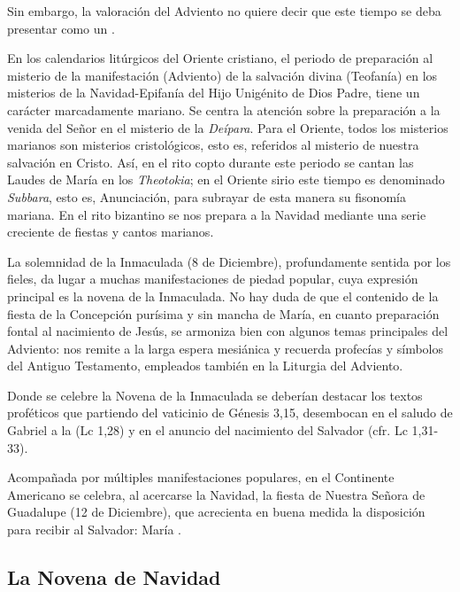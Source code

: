 \begin{introstyle}
	Sin embargo, la valoración del Adviento  no quiere decir que este tiempo se deba presentar como un .
	
	En los calendarios litúrgicos del Oriente cristiano, el periodo de preparación al misterio de la manifestación (Adviento) de la salvación divina (Teofanía) en los misterios de la Navidad-Epifanía del Hijo Unigénito de Dios Padre, tiene un carácter marcadamente mariano. Se centra la atención sobre la preparación a la venida del Señor en el misterio de la \emph{Deípara}. Para el Oriente, todos los misterios marianos son misterios cristológicos, esto es, referidos al misterio de nuestra salvación en Cristo. Así, en el rito copto durante este periodo se cantan las Laudes de María en los \emph{Theotokia}; en el Oriente sirio este tiempo es denominado \emph{Subbara}, esto es, Anunciación, para subrayar de esta manera su fisonomía mariana. En el rito bizantino se nos prepara a la Navidad mediante una serie creciente de fiestas y cantos marianos.
	
	La solemnidad de la Inmaculada (8 de Diciembre), profundamente sentida por los fieles, da lugar a muchas manifestaciones de piedad popular, cuya expresión principal es la novena de la Inmaculada. No hay duda de que el contenido de la fiesta de la Concepción purísima y sin mancha de María, en cuanto preparación fontal al nacimiento de Jesús, se armoniza bien con algunos temas principales del Adviento: nos remite a la larga espera mesiánica y recuerda profecías y símbolos del Antiguo Testamento, empleados también en la Liturgia del Adviento.
	
	Donde se celebre la Novena de la Inmaculada se deberían destacar los textos proféticos que partiendo del vaticinio de Génesis 3,15, desembocan en el saludo de Gabriel a la  (Lc 1,28) y en el anuncio del nacimiento del Salvador (cfr. Lc 1,31-33).
	
	Acompañada por múltiples manifestaciones populares, en el Continente Americano se celebra, al acercarse la Navidad, la fiesta de Nuestra Señora de Guadalupe (12 de Diciembre), que acrecienta en buena medida la disposición para recibir al Salvador: María .
	
	\subsection{La Novena de Navidad}
	

\end{introstyle}
